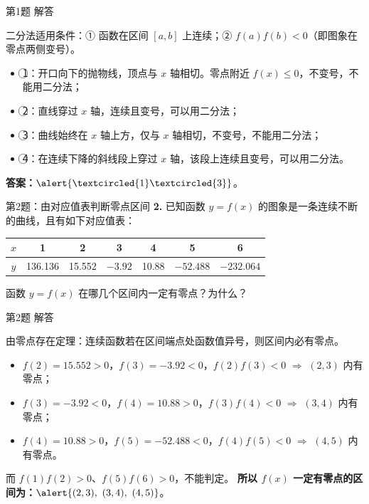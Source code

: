 \documentclass[10pt,aspectratio=169,serif]{beamer}
\begin{document}
\begin{frame}[t]{第1题 解答}
\begin{tcolorbox}[colback=orange!10,colframe=orange,title=\textbf{解}]
二分法适用条件：① 函数在区间 $[a,b]$ 上\alert{连续}；② $f(a)f(b)<0$（即图象在零点两侧\alert{变号}）。
\smallskip
\begin{itemize}
  \item \textcircled{1}：开口向下的抛物线，顶点与 $x$ 轴相切。零点附近 $f(x)\le 0$，\alert{不变号}，不能用二分法；
  \item \textcircled{2}：直线穿过 $x$ 轴，连续且变号，\alert{可以}用二分法；
  \item \textcircled{3}：曲线始终在 $x$ 轴上方，仅与 $x$ 轴相切，\alert{不变号}，不能用二分法；
  \item \textcircled{4}：在连续下降的斜线段上穿过 $x$ 轴，该段上连续且变号，\alert{可以}用二分法。
\end{itemize}
\smallskip
\textbf{答案：}$\alert{\textcircled{1}\textcircled{3}}$。
\end{tcolorbox}
\end{frame}

\begin{frame}[t]{第2题：由对应值表判断零点区间}
\textbf{2.} 已知函数 $y=f(x)$ 的图象是一条连续不断的曲线，且有如下对应值表：
\smallskip
\begin{center}
\begin{tabular}{c|cccccc}
$x$ & 1 & 2 & 3 & 4 & 5 & 6\\ \hline
$y$ & 136.136 & 15.552 & $-3.92$ & 10.88 & $-52.488$ & $-232.064$
\end{tabular}
\end{center}
函数 $y=f(x)$ 在哪几个区间内一定有零点？为什么？
\end{frame}

\begin{frame}[t]{第2题 解答}
\begin{tcolorbox}[colback=orange!10,colframe=orange,title=\textbf{解}]
由零点存在定理：连续函数若在区间端点处函数值异号，则区间内必有零点。
\smallskip
\begin{itemize}
  \item $f(2)=15.552>0$，$f(3)=-3.92<0$，$f(2)f(3)<0$ $\Rightarrow$ \alert{$(2,3)$ 内有零点}；
  \item $f(3)=-3.92<0$，$f(4)=10.88>0$，$f(3)f(4)<0$ $\Rightarrow$ \alert{$(3,4)$ 内有零点}；
  \item $f(4)=10.88>0$，$f(5)=-52.488<0$，$f(4)f(5)<0$ $\Rightarrow$ \alert{$(4,5)$ 内有零点}。
\end{itemize}
而 $f(1)f(2)>0$、$f(5)f(6)>0$，不能判定。
\smallskip
\textbf{所以 $f(x)$ 一定有零点的区间为：}$\alert{(2,3),\ (3,4),\ (4,5)}$。
\end{tcolorbox}
\end{frame}
\end{document}
